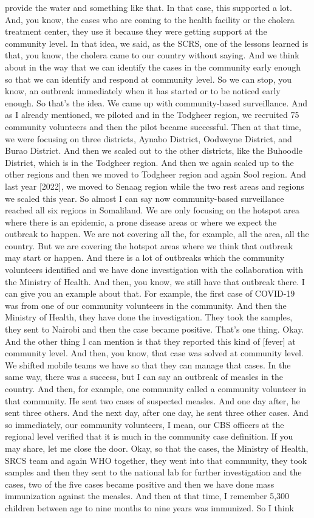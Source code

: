 provide the water and something like that. In that case, this supported a lot. And, you know, the cases who are coming to the health facility or the cholera treatment center, they use it because they were getting support at the community level. In that idea, we said, as the SCRS, one of the lessons learned is that, you know, the cholera came to our country without saying. And we think about in the way that we can identify the cases in the community early enough so that we can identify and respond at community level. So we can stop, you know, an outbreak immediately when it has started or to be noticed early enough. So that's the idea. We came up with community-based surveillance. And as I already mentioned, we piloted and in the Todgheer region, we recruited 75 community volunteers and then the pilot became successful. Then at that time, we were focusing on three districts, Aynabo District, Oodweyne District, and Burao District. And then we scaled out to the other districts, like the Buhoodle District, which is in the Todgheer region. And then we again scaled up to the other regions and then we moved to Todgheer region and again Sool region. And last year [2022], we moved to Senaag region while the two rest areas and regions we scaled this year. So almost I can say now community-based surveillance reached all six regions in Somaliland. We are only focusing on the hotspot area where there is an epidemic, a prone disease areas or where we expect the outbreak to happen. We are not covering all the, for example, all the area, all the country. But we are covering the hotspot areas where we think that outbreak may start or happen. And there is a lot of outbreaks which the community volunteers identified and we have done investigation with the collaboration with the Ministry of Health. And then, you know, we still have that outbreak there. I can give you an example about that. For example, the first case of COVID-19 was from one of our community volunteers in the community. And then the Ministry of Health, they have done the investigation. They took the samples, they sent to Nairobi and then the case became positive. That's one thing. Okay. And the other thing I can mention is that they reported this kind of [fever] at community level. And then, you know, that case was solved at community level. We shifted mobile teams we have so that they can manage that cases. In the same way, there was a success, but I can say an outbreak of measles in the country. And then, for example, one community called a community volunteer in that community. He sent two cases of suspected measles. And one day after, he sent three others. And the next day, after one day, he sent three other cases. And so immediately, our community volunteers, I mean, our CBS officers at the regional level verified that it is much in the community case definition. If you may share, let me close the door. Okay, so that the cases, the Ministry of Health, SRCS team and again WHO together, they went into that community, they took samples and then they sent to the national lab for further investigation and the cases, two of the five cases became positive and then we have done mass immunization against the measles. And then at that time, I remember 5,300 children between age to nine months to nine years was immunized. So I think 